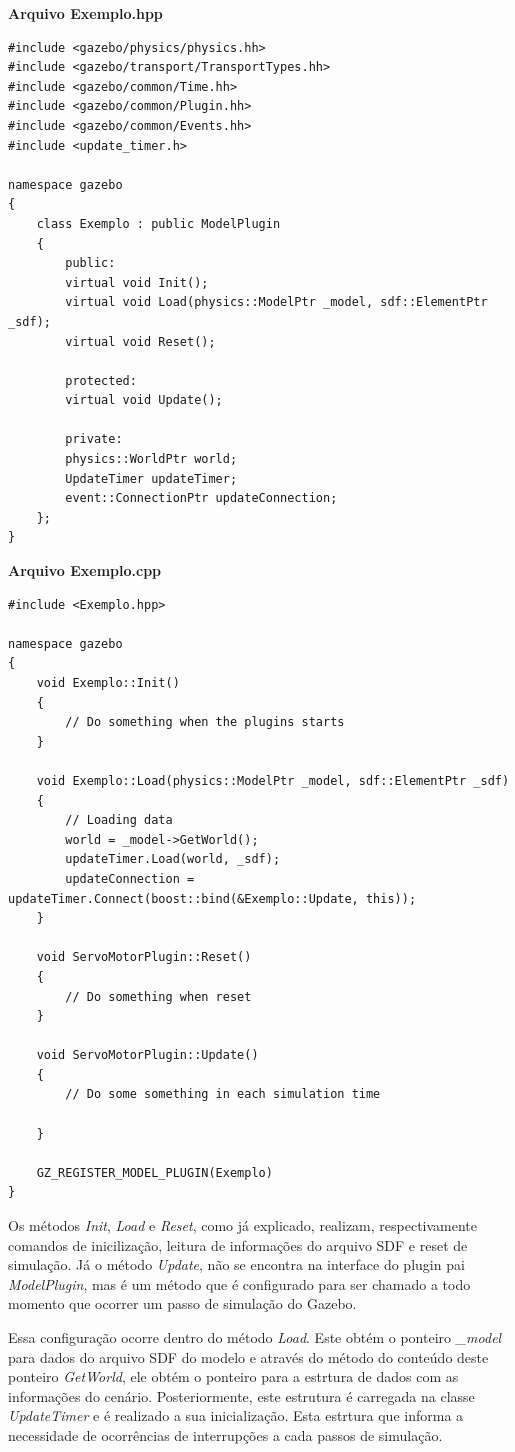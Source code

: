 \textbf{Arquivo Exemplo.hpp}

\begin{verbatim}
#include <gazebo/physics/physics.hh>
#include <gazebo/transport/TransportTypes.hh>
#include <gazebo/common/Time.hh>
#include <gazebo/common/Plugin.hh>
#include <gazebo/common/Events.hh>
#include <update_timer.h>

namespace gazebo
{
	class Exemplo : public ModelPlugin
	{		
		public: 
		virtual void Init();
		virtual void Load(physics::ModelPtr _model, sdf::ElementPtr _sdf); 
		virtual void Reset();
		
		protected: 
		virtual void Update(); 
		
		private:
		physics::WorldPtr world; 
		UpdateTimer updateTimer;
		event::ConnectionPtr updateConnection;
	};
}
\end{verbatim}

\textbf{Arquivo Exemplo.cpp}


\begin{verbatim}
#include <Exemplo.hpp>

namespace gazebo
{
	void Exemplo::Init()
	{
		// Do something when the plugins starts	
	}
	
	void Exemplo::Load(physics::ModelPtr _model, sdf::ElementPtr _sdf)
	{	
		// Loading data
		world = _model->GetWorld();	
		updateTimer.Load(world, _sdf);
		updateConnection = updateTimer.Connect(boost::bind(&Exemplo::Update, this));
	}
	
	void ServoMotorPlugin::Reset()
	{
		// Do something when reset
	}
	
	void ServoMotorPlugin::Update()
	{
		// Do some something in each simulation time
			
	}
	
	GZ_REGISTER_MODEL_PLUGIN(Exemplo)
}
\end{verbatim}

Os métodos \textit{Init}, \textit{Load} e \textit{Reset}, como já explicado, realizam, respectivamente comandos de inicilização, leitura de informações do arquivo SDF e reset de simulação. Já o método \textit{Update}, não se encontra na interface do plugin pai \textit{ModelPlugin}, mas é um método que é configurado para ser chamado a todo momento que ocorrer um passo de simulação do Gazebo.

Essa configuração ocorre dentro do método \textit{Load}. Este obtém o ponteiro \textit{\_model} para dados do arquivo SDF do modelo e através do método do conteúdo deste ponteiro \textit{GetWorld}, ele obtém o ponteiro para a estrtura de dados com as informações do cenário. Posteriormente, este estrutura é carregada na classe \textit{UpdateTimer} e é realizado a sua inicialização. Esta estrtura que informa a necessidade de ocorrências de interrupções a cada passos de simulação. 

